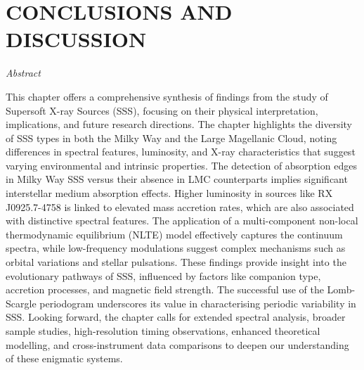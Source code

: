 \def\baselinestretch{1}
\chapter{CONCLUSIONS AND DISCUSSION} \label{chap:conclusion}
    \minitoc
    
    \newpage
    \begin{center}
    	\emph{Abstract}
    \end{center}
    This chapter offers a comprehensive synthesis of findings from the study of Supersoft X-ray Sources (SSS), focusing on their physical interpretation, implications, and future research directions. The chapter highlights the diversity of SSS types in both the Milky Way and the Large Magellanic Cloud, noting differences in spectral features, luminosity, and X-ray characteristics that suggest varying environmental and intrinsic properties. The detection of absorption edges in Milky Way SSS versus their absence in LMC counterparts implies significant interstellar medium absorption effects. Higher luminosity in sources like RX J0925.7-4758 is linked to elevated mass accretion rates, which are also associated with distinctive spectral features. The application of a multi-component non-local thermodynamic equilibrium (NLTE) model effectively captures the continuum spectra, while low-frequency modulations suggest complex mechanisms such as orbital variations and stellar pulsations. These findings provide insight into the evolutionary pathways of SSS, influenced by factors like companion type, accretion processes, and magnetic field strength. The successful use of the Lomb-Scargle periodogram underscores its value in characterising periodic variability in SSS. Looking forward, the chapter calls for extended spectral analysis, broader sample studies, high-resolution timing observations, enhanced theoretical modelling, and cross-instrument data comparisons to deepen our understanding of these enigmatic systems.
    
    \newpage
